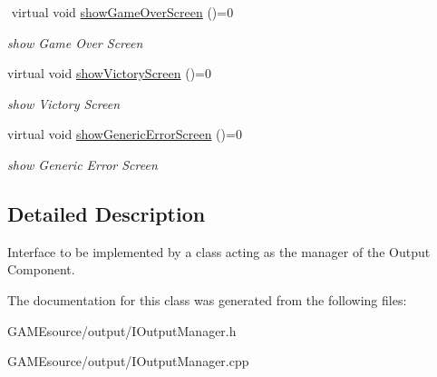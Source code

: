 \begin{DoxyCompactItemize}
$$\mbox{\label{class_i_output_manager_adc5ca9af7dc69324ee87233dcc7befc4}} 
virtual void \mbox{\hyperlink{class_i_output_manager_adc5ca9af7dc69324ee87233dcc7befc4}{show\+Game\+Over\+Screen}} ()=0
\begin{DoxyCompactList}\small\item\em show Game Over Screen \end{DoxyCompactList}\item 
\mbox{\label{class_i_output_manager_a89c5e1c35d72fb788db8b34eba956efe}} 
virtual void \mbox{\hyperlink{class_i_output_manager_a89c5e1c35d72fb788db8b34eba956efe}{show\+Victory\+Screen}} ()=0
\begin{DoxyCompactList}\small\item\em show Victory Screen \end{DoxyCompactList}\item 
\mbox{\label{class_i_output_manager_a9420b7d761af05b5ad23eadf074337f2}} 
virtual void \mbox{\hyperlink{class_i_output_manager_a9420b7d761af05b5ad23eadf074337f2}{show\+Generic\+Error\+Screen}} ()=0
\begin{DoxyCompactList}\small\item\em show Generic Error Screen \end{DoxyCompactList}\end{DoxyCompactItemize}


\subsection{Detailed Description}
Interface to be implemented by a class acting as the manager of the Output Component. 

The documentation for this class was generated from the following files\+:\begin{DoxyCompactItemize}
\item 
G\+A\+M\+Esource/output/I\+Output\+Manager.\+h\item 
G\+A\+M\+Esource/output/I\+Output\+Manager.\+cpp\end{DoxyCompactItemize}
